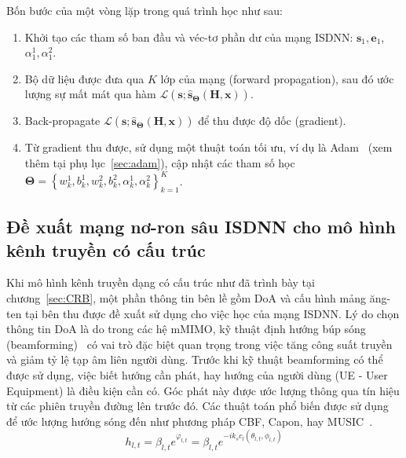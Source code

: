 Bốn bước của một vòng lặp trong quá trình học như sau:
\begin{enumerate}
    \item Khởi tạo các tham số ban đầu và véc-tơ phần dư của mạng ISDNN: $\mathbf{s}_1, \mathbf{e}_1$, $\alpha^1_1, \alpha^2_1$.

    \item Bộ dữ liệu được đưa qua $K$ lớp của mạng (forward propagation), sau đó ước lượng sự mất mát qua hàm $\mathcal{L}(\mathbf{s}; \hat{\mathbf{s}}_{\boldsymbol{\Theta}}(\mathbf{H}, \mathbf{x}))$.

    \item Back-propagate $\mathcal{L}(\mathbf{s}; \hat{\mathbf{s}}_{\boldsymbol{\Theta}}(\mathbf{H}, \mathbf{x}))$ để thu được độ dốc (gradient).

    \item Từ gradient thu được, sử dụng một thuật toán tối ưu, ví dụ là Adam~\cite{Diederik2014} (xem thêm tại phụ lục~\ref{sec:adam}), cập nhật các tham số học $\boldsymbol{\Theta}=\left\{w^1_{k}, b^1_{k}, w^2_{k}, b^2_{k}, \alpha^1_k, \alpha^2_k \right\}_{k=1}^K$.
\end{enumerate}

\subsection{Đề xuất mạng nơ-ron sâu ISDNN cho mô hình kênh truyền có cấu trúc}

Khi mô hình kênh truyền dạng có cấu trúc như đã trình bày tại chương~\ref{sec:CRB}, một phần thông tin bên lề gồm DoA và cấu hình mảng ăng-ten tại bên thu được đề xuất sử dụng cho việc học của mạng ISDNN. Lý do chọn thông tin DoA là do trong các hệ mMIMO, kỹ thuật định hướng búp sóng (beamforming)~\cite{shaik2021} có vai trò đặc biệt quan trọng trong việc tăng công suất truyền và giảm tỷ lệ tạp âm liên người dùng. Trước khi kỹ thuật beamforming có thể được sử dụng, việc biết hướng cần phát, hay hướng của người dùng (UE - User Equipment) là điều kiện cần có. Góc phát này được ước lượng thông qua tín hiệu từ các phiên truyền đường lên trước đó. Các thuật toán phổ biến được sử dụng để ước lượng hướng sóng đến như phương pháp CBF, Capon, hay MUSIC~\cite{Wang2016}. 
\begin{equation}
    \label{eq:28}
    h_{l, t} = \beta_{l, t} e^{\varphi_{l, t}} = \beta_{l, t} e^{-i k_s c_l (\theta_{l, t}, \phi_{l, t})}
\end{equation}

